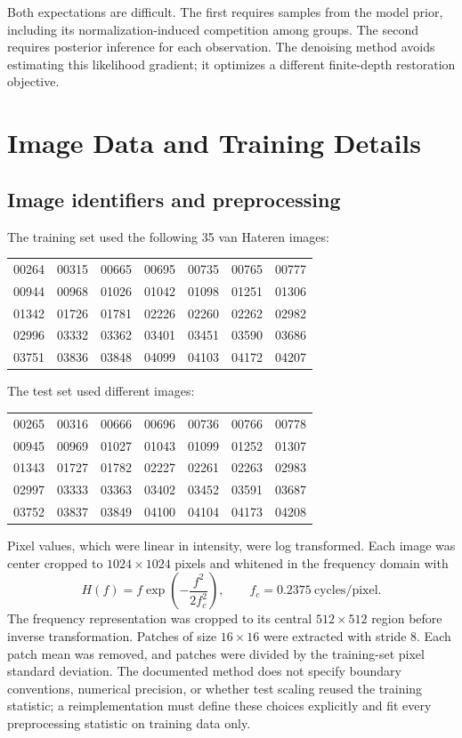 Both expectations are difficult. The first requires samples from the model prior, including its normalization-induced competition among groups. The second requires posterior inference for each observation. The denoising method avoids estimating this likelihood gradient; it optimizes a different finite-depth restoration objective.

\chapter{Image Data and Training Details}
\label{app:image-details}

\section{Image identifiers and preprocessing}
\label{app:image-preprocessing}

The training set used the following 35 van Hateren images:
\begin{center}\small
\begin{tabular}{rrrrrrr}
00264&00315&00665&00695&00735&00765&00777\\
00944&00968&01026&01042&01098&01251&01306\\
01342&01726&01781&02226&02260&02262&02982\\
02996&03332&03362&03401&03451&03590&03686\\
03751&03836&03848&04099&04103&04172&04207
\end{tabular}
\end{center}
The test set used different images:
\begin{center}\small
\begin{tabular}{rrrrrrr}
00265&00316&00666&00696&00736&00766&00778\\
00945&00969&01027&01043&01099&01252&01307\\
01343&01727&01782&02227&02261&02263&02983\\
02997&03333&03363&03402&03452&03591&03687\\
03752&03837&03849&04100&04104&04173&04208
\end{tabular}
\end{center}

Pixel values, which were linear in intensity, were log transformed. Each image was center cropped to $1024\times1024$ pixels and whitened in the frequency domain with
\begin{equation}
H(f)=f\exp\left(-\frac{f^2}{2f_c^2}\right),
\qquad f_c=0.2375\ \text{cycles/pixel}.
\end{equation}
The frequency representation was cropped to its central $512\times512$ region before inverse transformation. Patches of size $16\times16$ were extracted with stride 8. Each patch mean was removed, and patches were divided by the training-set pixel standard deviation. The documented method does not specify boundary conventions, numerical precision, or whether test scaling reused the training statistic; a reimplementation must define these choices explicitly and fit every preprocessing statistic on training data only.

